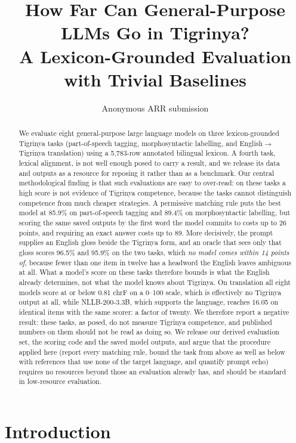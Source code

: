\documentclass[11pt]{article}
\title{How Far Can General-Purpose LLMs Go in Tigrinya?\\
A Lexicon-Grounded Evaluation with Trivial Baselines}
\author{Anonymous ARR submission}
\begin{document}
\maketitle

\begin{abstract}
We evaluate eight general-purpose large language models on three
lexicon-grounded Tigrinya tasks (part-of-speech tagging, morphosyntactic
labelling, and English$\rightarrow$Tigrinya translation) using a 5,783-row
annotated bilingual lexicon. A fourth task, lexical alignment, is not well
enough posed to carry a result, and we release its data and outputs as a
resource for reposing it rather than as a benchmark.
Our central methodological finding is that such
evaluations are easy to over-read: on these tasks a high score is not
evidence of Tigrinya competence, because the tasks cannot distinguish
competence from much cheaper strategies. A permissive matching rule puts the
best model at 85.9\% on part-of-speech tagging and 89.4\% on morphosyntactic
labelling, but scoring the same saved outputs by the first word the model
commits to costs up to 26 points, and requiring an exact answer costs up to
89. More decisively, the prompt supplies an English gloss beside the
Tigrinya form, and an oracle that sees only that gloss scores 96.5\% and
95.9\% on the two tasks, which \emph{no model comes within 14 points of},
because fewer than one item in twelve has a headword the English leaves
ambiguous at all.
What a model's score on these tasks therefore bounds is what the English
already determines, not what the model knows about Tigrinya. On translation all eight models score at or
below 0.81 chrF on a 0--100 scale, which is effectively no Tigrinya output at
all, while NLLB-200-3.3B, which supports the language, reaches 16.05 on
identical items with the same scorer: a factor of twenty. We therefore report a
negative result: these tasks, as posed, do not measure Tigrinya competence,
and published numbers on them should not be read as doing so. We release our
derived evaluation set, the scoring code and the saved model outputs, and
argue that the
procedure applied here (report every matching rule, bound the task from
above as well as below with references that use none of the target language,
and quantify prompt echo) requires no resources beyond those an evaluation
already has, and should be standard in low-resource evaluation.
\end{abstract}

\section{Introduction}
\label{sec:intro}
\end{document}
